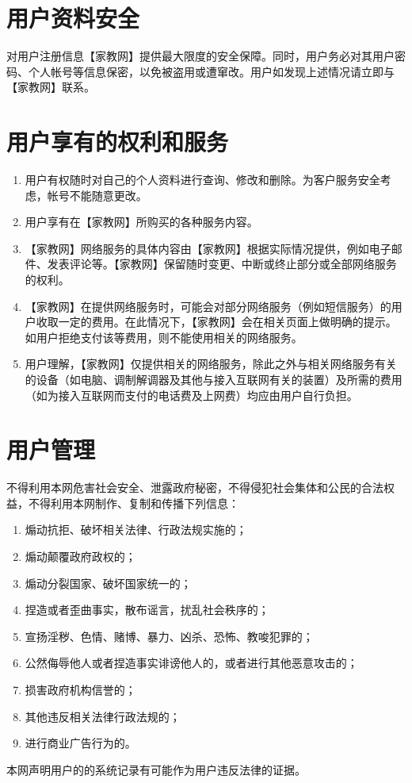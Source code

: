 \documentclass[UTF8]{ctexart}
\newcommand{\proName}{【家教网】}
\begin{document}
    \section{用户资料安全}
        对用户注册信息{\proName}提供最大限度的安全保障。同时，用户务必对其用户密码、个人帐号等信息保密，以免被盗用或遭窜改。用户如发现上述情况请立即与{\proName}联系。
    \section{用户享有的权利和服务}
        \begin{enumerate}
            \item 用户有权随时对自己的个人资料进行查询、修改和删除。为客户服务安全考虑，帐号不能随意更改。
            \item 用户享有在{\proName}所购买的各种服务内容。
            \item {\proName}网络服务的具体内容由{\proName}根据实际情况提供，例如电子邮件、发表评论等。{\proName}保留随时变更、中断或终止部分或全部网络服务的权利。
            \item {\proName}在提供网络服务时，可能会对部分网络服务（例如短信服务）的用户收取一定的费用。在此情况下，{\proName}会在相关页面上做明确的提示。如用户拒绝支付该等费用，则不能使用相关的网络服务。
            \item 用户理解，{\proName}仅提供相关的网络服务，除此之外与相关网络服务有关的设备（如电脑、调制解调器及其他与接入互联网有关的装置）及所需的费用（如为接入互联网而支付的电话费及上网费）均应由用户自行负担。
        \end{enumerate}
    \section{用户管理}
        不得利用本网危害社会安全、泄露政府秘密，不得侵犯社会集体和公民的合法权益，不得利用本网制作、复制和传播下列信息：
        \begin{enumerate}
            \item 煽动抗拒、破坏相关法律、行政法规实施的；
            \item 煽动颠覆政府政权的；
            \item 煽动分裂国家、破坏国家统一的；
            \item 捏造或者歪曲事实，散布谣言，扰乱社会秩序的；
            \item 宣扬淫秽、色情、赌博、暴力、凶杀、恐怖、教唆犯罪的；
            \item 公然侮辱他人或者捏造事实诽谤他人的，或者进行其他恶意攻击的；
            \item 损害政府机构信誉的；
            \item 其他违反相关法律行政法规的；
            \item 进行商业广告行为的。
        \end{enumerate}
        本网声明用户的的系统记录有可能作为用户违反法律的证据。
\end{document}
